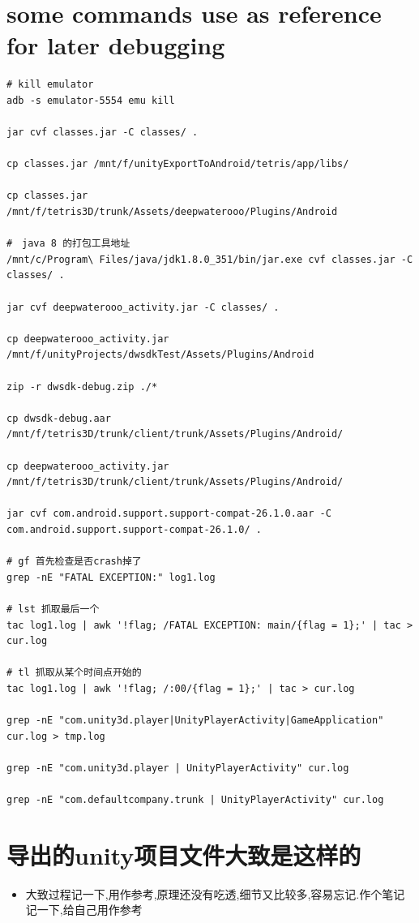 \documentclass[9pt, b5paper]{article}
\begin{document}
\section{some commands use as reference for later debugging}
\label{sec-3}
\begin{verbatim}
# kill emulator
adb -s emulator-5554 emu kill   

jar cvf classes.jar -C classes/ .

cp classes.jar /mnt/f/unityExportToAndroid/tetris/app/libs/

cp classes.jar /mnt/f/tetris3D/trunk/Assets/deepwaterooo/Plugins/Android 

#　java 8 的打包工具地址
/mnt/c/Program\ Files/java/jdk1.8.0_351/bin/jar.exe cvf classes.jar -C classes/ . 

jar cvf deepwaterooo_activity.jar -C classes/ .       

cp deepwaterooo_activity.jar /mnt/f/unityProjects/dwsdkTest/Assets/Plugins/Android 

zip -r dwsdk-debug.zip ./*

cp dwsdk-debug.aar /mnt/f/tetris3D/trunk/client/trunk/Assets/Plugins/Android/

cp deepwaterooo_activity.jar /mnt/f/tetris3D/trunk/client/trunk/Assets/Plugins/Android/

jar cvf com.android.support.support-compat-26.1.0.aar -C com.android.support.support-compat-26.1.0/ .

# gf 首先检查是否crash掉了 
grep -nE "FATAL EXCEPTION:" log1.log

# lst 抓取最后一个
tac log1.log | awk '!flag; /FATAL EXCEPTION: main/{flag = 1};' | tac > cur.log

# tl 抓取从某个时间点开始的
tac log1.log | awk '!flag; /:00/{flag = 1};' | tac > cur.log

grep -nE "com.unity3d.player|UnityPlayerActivity|GameApplication" cur.log > tmp.log

grep -nE "com.unity3d.player | UnityPlayerActivity" cur.log

grep -nE "com.defaultcompany.trunk | UnityPlayerActivity" cur.log
\end{verbatim}

\section{导出的unity项目文件大致是这样的}
\label{sec-4}
\begin{itemize}
\item 大致过程记一下,用作参考,原理还没有吃透,细节又比较多,容易忘记.作个笔记记一下,给自己用作参考
\end{itemize}
\end{document}
